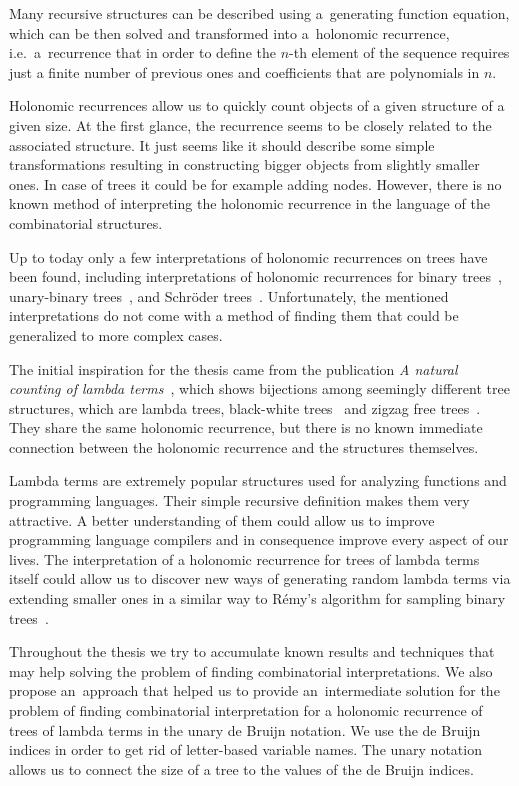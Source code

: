 \documentclass[final]{article}
\theoremstyle{definition}
\theoremstyle{definition}
\theoremstyle{remark}
\begin{document}
Many recursive structures can be described using a~generating function equation, which can be then solved and transformed into a~holonomic recurrence, i.e.~a~recurrence that in order to define the \(n\)-th element of the sequence requires just a finite number of previous ones and coefficients that are polynomials in \(n\).

Holonomic recurrences allow us to quickly count objects of a given structure of a given size. At the first glance, the recurrence seems to be closely related to the associated structure. It just seems like it should describe some simple transformations resulting in constructing bigger objects from slightly smaller ones. In case of trees it could be for example adding nodes. However, there is no known method of interpreting the holonomic recurrence in the language of the combinatorial structures.

Up to today only a few interpretations of holonomic recurrences on trees have been found, including interpretations of holonomic recurrences for binary trees~\cite{binary}, unary-binary trees~\cite{motzkin}, and Schröder trees~\cite{schroder}. Unfortunately, the mentioned interpretations do not come with a method of finding them that could be generalized to more complex cases.

The initial inspiration for the thesis came from the publication \textit{A natural counting of lambda terms}~\cite{inspiration}, which shows bijections among seemingly different tree structures, which are lambda trees, black-white trees~\cite{blackwhite} and zigzag free trees~\cite{inspiration}. They share the same holonomic recurrence, but there is no known immediate connection between the holonomic recurrence and the structures themselves.

Lambda terms are extremely popular structures used for analyzing functions and programming languages. Their simple recursive definition makes them very attractive. A better understanding of them could allow us to improve programming language compilers and in consequence improve every aspect of our lives. The interpretation of a holonomic recurrence for trees of lambda terms itself could allow us to discover new ways of generating random lambda terms via extending smaller ones in a similar way to Rémy's algorithm for sampling binary trees~\cite{remy,note}.

Throughout the thesis we try to accumulate known results and techniques that may help solving the problem of finding combinatorial interpretations. We also propose an~approach that helped us to provide an~intermediate solution for the problem of finding combinatorial interpretation for a holonomic recurrence of trees of lambda terms in the unary de Bruijn notation. We use the de Bruijn indices in order to get rid of letter-based variable names. The unary notation allows us to connect the size of a tree to the values of the de Bruijn indices.
\end{document}
